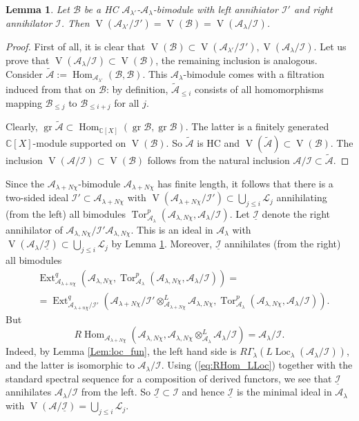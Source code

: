 \documentclass[12pt]{amsart}
\newcommand{\A}{\mathcal{A}}
\newcommand{\I}{\mathcal{I}}
\newcommand{\VA}{\operatorname{V}}
\newcommand{\gr}{\operatorname{gr}}
\newcommand{\B}{\mathcal{B}}
\newcommand{\C}{\mathbb{C}}
\newcommand{\Loc}{\operatorname{Loc}}
\newtheorem{Lem}[Thm]{Lemma}
\theoremstyle{definition}
\begin{document}
\begin{Lem}\label{Lem:LR_Ann}
Let $\B$ be a HC $\A_{\lambda'}$-$\A_\lambda$-bimodule with left annihiator $\I'$ and right annihilator $\I$.
Then $\VA(\A_{\lambda'}/\I')=\VA(\B)=\VA(\A_\lambda/\I)$.
\end{Lem}
\begin{proof}
First of all, it is clear that $\VA(\B)\subset \VA(\A_{\lambda'}/\I'),\VA(\A_\lambda/\I)$.
Let us prove that $\VA(\A_\lambda/\I)\subset \VA(\B)$, the remaining inclusion is analogous.
Consider $\tilde{\A}:=\operatorname{Hom}_{\A_{\lambda'}}(\B,\B)$. This $\A_\lambda$-bimodule
comes with a filtration induced from that on $\B$: by definition, $\tilde{\A}_{\leqslant i}$
consists of all homomorphisms mapping $\B_{\leqslant j}$ to $\B_{\leqslant i+j}$
for all $j$.

Clearly, $\gr\tilde{\A}\subset
\operatorname{Hom}_{\C[X]}(\gr\B,\gr\B)$. The latter is a finitely generated $\C[X]$-module
supported on $\VA(\B)$. So $\tilde{\A}$ is HC and $\VA(\tilde{\A})\subset \VA(\B)$.
The inclusion $\VA(\A/\I)\subset \VA(\B)$ follows from the natural inclusion $\A/\I\subset
\tilde{\A}$.
\end{proof}

Since the $\A_{\lambda+N\chi}$-bimodule $\A_{\lambda+N\chi}$ has finite length, it follows that
there is a two-sided ideal $\I'\subset \A_{\lambda+N\chi}$ with $\VA(\A_{\lambda+N\chi}/\I')\subset\bigcup_{j\leqslant i}\mathcal{L}_j$ annihilating (from the left) all bimodules $\operatorname{Tor}^p_{\A_\lambda}(\A_{\lambda,N\chi}, \A_\lambda/\I)$.
Let $\underline{\I}$ denote the right annihilator of $\A_{\lambda,N\chi}/\I'\A_{\lambda,N\chi}$.
This is an ideal in $\A_\lambda$ with $\VA(\A_\lambda/\underline{\I})\subset \bigcup_{j\leqslant i}\mathcal{L}_j$
by Lemma \ref{Lem:LR_Ann}. Moreover, $\underline{\I}$ annihilates (from the right) all bimodules
\begin{align*}&\operatorname{Ext}^q_{\A_{\lambda+n\chi}}(\A_{\lambda,N\chi}, \operatorname{Tor}^p_{\A_\lambda}(\A_{\lambda,N\chi}, \A_\lambda/\I))=\\&=\operatorname{Ext}^q_{\A_{\lambda+n\chi}/\I'}(\A_{\lambda+N\chi}/\I'\otimes^L_{\A_{\lambda+N\chi}}\A_{\lambda,N\chi}, \operatorname{Tor}^p_{\A_\lambda}(\A_{\lambda,N\chi}, \A_\lambda/\I)).\end{align*}
But \begin{equation}\label{eq:RHom_LLoc} R\operatorname{Hom}_{\A_{\lambda+N\chi}}(\A_{\lambda, N\chi}, \A_{\lambda,N\chi}\otimes^L_{\A_\lambda}\A_\lambda/\I)=\A_\lambda/\I.\end{equation}
Indeed, by Lemma \ref{Lem:loc_fun}, the left hand side is $R\Gamma_\lambda(L\Loc_\lambda(\A_\lambda/\I))$,
and the latter is isomorphic to $\A_\lambda/\I$. Using (\ref{eq:RHom_LLoc}) together with
the standard spectral sequence for a composition of derived functors,
we see that $\underline{\I}$ annihilates $\A_\lambda/\I$ from the left.
So $\underline{\I}\subset \I$ and hence $\underline{\I}$ is the minimal ideal in $\A_\lambda$ with
$\VA(\A/\underline{\I})=\bigcup_{j\leqslant i}\mathcal{L}_j$.
\end{document}

